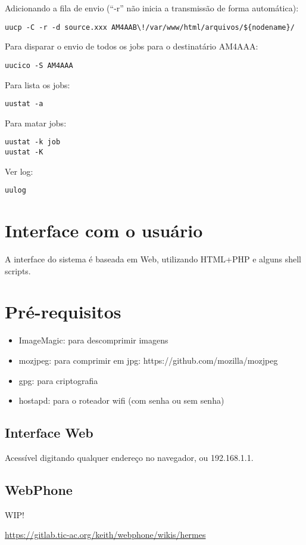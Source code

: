 \documentclass[11pt,a4paper]{article}
\begin{document}
Adicionando a fila de envio (``-r'' não inicia a transmissão de forma
automática):
\begin{verbatim}
uucp -C -r -d source.xxx AM4AAB\!/var/www/html/arquivos/${nodename}/
\end{verbatim}

Para disparar o envio de todos os jobs para o destinatário
AM4AAA:
\begin{verbatim}
uucico -S AM4AAA
\end{verbatim}

Para lista os jobs:
\begin{verbatim}
uustat -a
\end{verbatim}

Para matar jobs:
\begin{verbatim}
uustat -k job
uustat -K
\end{verbatim}

Ver log:
\begin{verbatim}
uulog
\end{verbatim}

\section{Interface com o usuário}

A interface do sistema é baseada em Web, utilizando HTML+PHP e
alguns shell scripts.

\section{Pré-requisitos}

\begin{itemize}
\item ImageMagic: para descomprimir imagens
\item mozjpeg: para comprimir em jpg: https://github.com/mozilla/mozjpeg
\item gpg: para criptografia
\item hostapd: para o roteador wifi (com senha ou sem senha)
\end{itemize}

\subsection{Interface Web}

Acessível digitando qualquer endereço no navegador, ou 192.168.1.1.

\subsection{WebPhone}

WIP!

\url{https://gitlab.tic-ac.org/keith/webphone/wikis/hermes}
\end{document}
